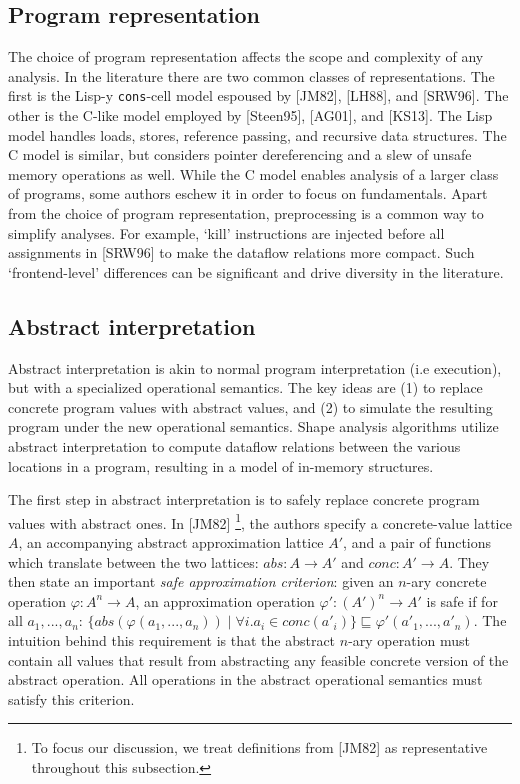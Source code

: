\documentclass{article}
\begin{document}
\subsection{Program representation}

The choice of program representation affects the scope and complexity of any
analysis. In the literature there are two common classes of representations.
The first is the Lisp-y \texttt{cons}-cell model espoused by [JM82], [LH88],
and [SRW96]. The other is the C-like model employed by [Steen95], [AG01],
and [KS13]. The Lisp model handles loads, stores, reference passing, and
recursive data structures.  The C model is similar, but considers pointer
dereferencing and a slew of unsafe memory operations as well. While the C
model enables analysis of a larger class of programs, some authors eschew it
in order to focus on fundamentals. Apart from the choice of program
representation, preprocessing is a common way to simplify analyses. For
example,  `kill' instructions are injected before all assignments in [SRW96]
to make the dataflow relations more compact. Such `frontend-level'
differences can be significant and drive diversity in the literature.

\subsection{Abstract interpretation}

Abstract interpretation is akin to normal program interpretation (i.e
execution), but with a specialized operational semantics. The key ideas are
(1) to replace concrete program values with abstract values, and (2) to 
simulate the resulting program under the new operational semantics. Shape
analysis algorithms utilize abstract interpretation to compute dataflow
relations between the various locations in a program, resulting in a model
of in-memory structures.

The first step in abstract interpretation is to safely replace concrete
program values with abstract ones. In [JM82] \footnote{To focus our
discussion, we treat definitions from [JM82] as representative throughout 
this subsection.}, the authors specify a concrete-value lattice $A$, an
accompanying abstract approximation lattice $A'$, and a pair of functions
which translate between the two lattices: $abs : A \rightarrow A'$ and $conc
: A' \rightarrow A$. They then state an important \textit{safe approximation
criterion}: given an $n$-ary concrete operation $\varphi : A^n \rightarrow
A$, an approximation operation $\varphi' : (A')^n \rightarrow A'$ is safe if
for all $a_1, ..., a_n$: $\{abs(\varphi(a_1, ..., a_n)) \mid \forall i.  a_i
\in conc(a'_i)\} \sqsubseteq \varphi'(a'_1, ..., a'_n)$. The intuition behind
this requirement is that the abstract $n$-ary operation must contain all
values that result from abstracting any feasible concrete version of the
abstract operation. All operations in the abstract operational semantics
must satisfy this criterion.
\end{document}
